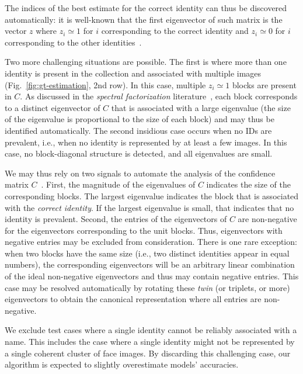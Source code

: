 \documentclass[10pt,twocolumn,letterpaper]{article}
\begin{document}
The indices of the best estimate for the correct identity can thus be discovered automatically: it is well-known that the first eigenvector of such matrix is the vector $z$ where $z_i \simeq 1$ for $i$ corresponding to the correct identity and $z_i \simeq 0$ for $i$ corresponding to the other identities~\cite{shi1997normalized,perona1998factorization,shi2000normalized,zelnik2004self}.

Two more challenging situations are possible. The first is where more than one identity is present in the collection and associated with multiple images (Fig.~\ref{fig:gt-estimation}, 2nd row). In this case, multiple $z_i\simeq 1$ blocks are present in $C$. As discussed in the {\em spectral factorization} literature~\cite{perona1998factorization,shi2000normalized,zelnik2004self}, each block corresponds to a distinct eigenvector of $C$ that is associated with a large eigenvalue (the size of the eigenvalue is proportional to the size of each block) and may thus be identified automatically. The second insidious case occurs when no IDs are prevalent, i.e., when no identity is represented by at least a few images. In this case, no block-diagonal structure is detected, and all eigenvalues are small.

We may thus rely on two signals to automate the analysis of the confidence matrix $C$~\cite{perona1998factorization}. First, the magnitude of the eigenvalues of $C$ indicates the size of the corresponding blocks. The largest eigenvalue indicates the block that is associated with the {\em correct identity}. If the largest eigenvalue is small, that indicates that no identity is prevalent. Second, the entries of the eigenvectors of $C$ are non-negative for the eigenvectors corresponding to the unit blocks. Thus, eigenvectors with negative entries may be excluded from consideration. There is one rare exception: when two blocks have the same size (i.e., two distinct identities appear in equal numbers), the corresponding eigenvectors will be an arbitrary linear combination of the ideal non-negative eigenvectors and thus may contain negative entries. This case may be resolved automatically by rotating these {\em twin} (or triplets, or more) eigenvectors to obtain the canonical representation where all entries are non-negative.

We exclude test cases where a single identity cannot be reliably associated with a name. 
This includes the case where a single identity might not be represented by a single coherent cluster of face images. By discarding this challenging case, our algorithm is expected to slightly overestimate models' accuracies.
\end{document}
